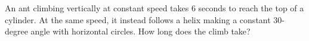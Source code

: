 An ant climbing vertically at constant speed takes 6 seconds to reach the top of a cylinder. At the same speed, it instead follows a helix making a constant 30-degree angle with horizontal circles. How long does the climb take?
